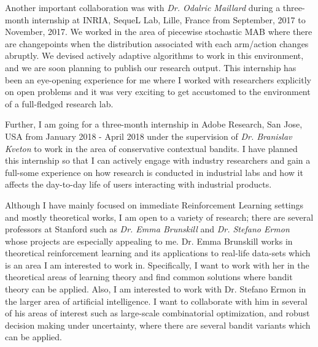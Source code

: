 \documentclass[twoside]{article}
\begin{document}
    Another important collaboration was with \textit{Dr. Odalric Maillard} during a three-month internship at INRIA, SequeL Lab, Lille, France from September, 2017 to November, 2017. We worked in the area of piecewise stochastic MAB where there are changepoints when the distribution associated with each arm/action changes abruptly. We devised actively adaptive algorithms to work in this environment, and we are soon planning to publish our research output. This internship has been an eye-opening experience for me where I worked with researchers explicitly on open problems and it was very exciting to get accustomed to the environment of a full-fledged research lab. 
    
    Further, I am going for a three-month internship in Adobe Research, San Jose, USA from January 2018 - April 2018 under the supervision of \textit{Dr. Branislav Kveton} to work in the area of conservative contextual bandits. I have planned this internship so that I can actively engage with industry researchers and gain a full-some experience on how research is conducted in industrial labs and how it affects the day-to-day life of users interacting with industrial products. 


	Although I have mainly focused on immediate Reinforcement Learning settings and mostly theoretical works, I am open to a variety of research; there are several professors at Stanford such as \textit{Dr. Emma Brunskill} and \textit{Dr. Stefano Ermon} whose projects are especially appealing to me. Dr. Emma Brunskill works in theoretical reinforcement  learning and its applications to real-life data-sets which is an area I am interested to work in. Specifically, I want to work with her in the theoretical areas of learning theory and find common solutions where bandit theory can be applied. Also, I am interested to work with Dr. Stefano Ermon in the larger area of artificial intelligence. I want to collaborate with him in several of his areas of interest such as large-scale combinatorial optimization, and robust decision making under uncertainty, where there are several bandit variants which can be applied.
\end{document}
